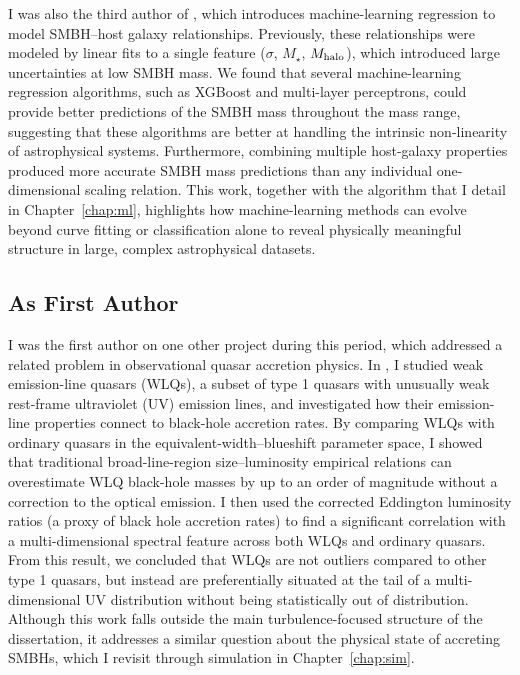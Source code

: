 I was also the third author of \citet{reinheimer_black_2025}, which introduces machine-learning regression to model SMBH--host galaxy relationships. 
Previously, these relationships were modeled by linear fits to a single feature ($\sigma$, $M_{\star}$, $M_{\rm halo}$), which introduced large uncertainties at low SMBH mass. 
We found that several machine-learning regression algorithms, such as XGBoost and multi-layer perceptrons, could provide better predictions of the SMBH mass throughout the mass range, suggesting that these algorithms are better at handling the intrinsic non-linearity of astrophysical systems.
Furthermore, combining multiple host-galaxy properties produced more accurate SMBH mass predictions than any individual one-dimensional scaling relation.
This work, together with the algorithm that I detail in Chapter~\ref{chap:ml}, highlights how machine-learning methods can evolve beyond curve fitting or classification alone to reveal physically meaningful structure in large, complex astrophysical datasets.

\subsection{As First Author}

I was the first author on one other project during this period, which addressed a related problem in observational quasar accretion physics. 
In \citet{ha_shedding_2023}, I studied weak emission-line quasars (WLQs), a subset of type 1 quasars with unusually weak rest-frame ultraviolet (UV) emission lines, and investigated how their emission-line properties connect to black-hole accretion rates. 
By comparing WLQs with ordinary quasars in the  equivalent-width--blueshift parameter space, I showed that traditional broad-line-region size--luminosity empirical relations can overestimate WLQ black-hole masses by up to an order of magnitude without a correction to the optical  emission.
I then used the corrected Eddington luminosity ratios (a proxy of black hole accretion rates) to find a significant correlation with a multi-dimensional  spectral feature across both WLQs and ordinary quasars.
From this result, we concluded that WLQs are not outliers compared to other type 1 quasars, but instead are preferentially situated at the tail of a multi-dimensional UV distribution without being statistically out of distribution. 
Although this work falls outside the main turbulence-focused structure of the dissertation, it addresses a similar question about the physical state of accreting SMBHs, which I revisit through simulation in Chapter~\ref{chap:sim}.

